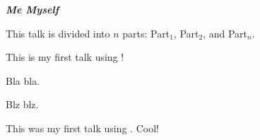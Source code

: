 \documentclass[landscape]{slides}
\begin{document}
 \vspace*{5cm}\centerline{{\large \bf \em Me Myself}}

	This talk is divided into $n$ parts: Part$_1$, Part$_2$, and Part$_n$.

	This is my first talk using {\ActiveDVI}!

	Bla bla.

	Blz blz.

	This was my first talk using {\ActiveDVI}. Cool!
\end{document}
